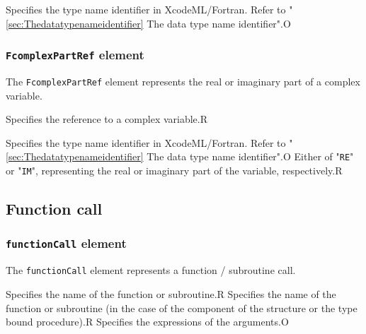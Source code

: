 \begin{XcodeMLAttributes}
{Specifies the type name identifier in XcodeML/Fortran.
 Refer to "\ref{sec:Thedatatypenameidentifier} The data type name identifier".}{O}
\end{XcodeMLAttributes}


\subsubsection{ {\tt FcomplexPartRef} element}

The {\tt FcomplexPartRef} element represents the real or imaginary part
of a complex variable.


\begin{XcodeMLChildElements}
{Specifies the reference to a complex variable.}{R}
\end{XcodeMLChildElements}

\begin{XcodeMLAttributes}
{Specifies the type name identifier in XcodeML/Fortran.
 Refer to "\ref{sec:Thedatatypenameidentifier} The data type name identifier".}{O}
{Either of "{\tt RE}" or "{\tt IM}", representing the real or imaginary
  part of the variable, respectively.}{R}
\end{XcodeMLAttributes}

\subsection{Function call}

\subsubsection{ {\tt functionCall} element}

The {\tt functionCall} element represents a function / subroutine call.


\begin{XcodeMLChildElements}
{Specifies the name of the function or subroutine.}{R}
{Specifies the name of the function or subroutine
 (in the case of the component of the structure or the type bound procedure).}{R}
{Specifies the expressions of the arguments.}{O}
\end{XcodeMLChildElements}

